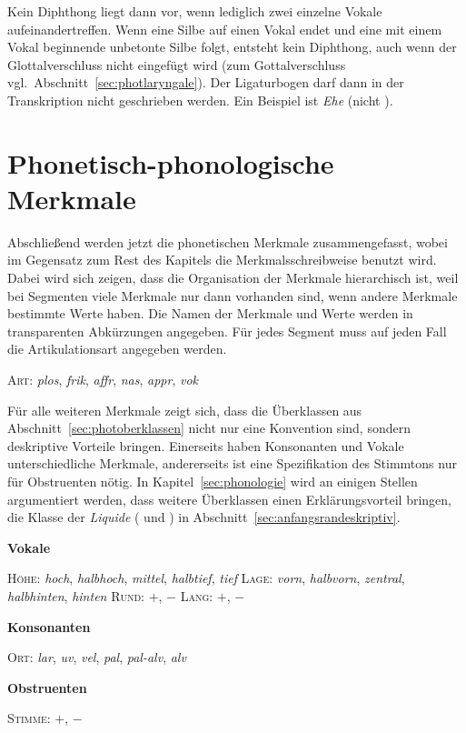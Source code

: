 Kein Diphthong liegt dann vor, wenn lediglich zwei einzelne Vokale aufeinandertreffen.
Wenn eine Silbe auf einen Vokal endet und eine mit einem Vokal beginnende unbetonte Silbe folgt, entsteht kein Diphthong, auch wenn der Glottalverschluss nicht eingefügt wird (zum Gottalverschluss vgl.\ Abschnitt~\ref{sec:photlaryngale}).
Der Ligaturbogen darf dann in der Transkription nicht geschrieben werden.
Ein Beispiel ist \textit{Ehe} \textipa{[Pe:@]} (nicht \Ast\textipa{[P\t{e@}]}).

\section{Phonetisch-phonologische Merkmale}

\label{sec:photpholmerkmale}

Abschließend werden jetzt die phonetischen Merkmale zusammengefasst, wobei im Gegensatz zum Rest des Kapitels die Merkmalsschreibweise benutzt wird.
Dabei wird sich zeigen, dass die Organisation der Merkmale hierarchisch ist, weil bei Segmenten viele Merkmale nur dann vorhanden sind, wenn andere Merkmale bestimmte Werte haben.
Die Namen der Merkmale und Werte werden in transparenten Abkürzungen angegeben.
Für jedes Segment muss auf jeden Fall die Artikulationsart angegeben werden.

\begin{exe}
	\ex \textsc{Art}: \textit{plos}, \textit{frik}, \textit{affr}, \textit{nas}, \textit{appr}, \textit{vok}
\end{exe}

Für alle weiteren Merkmale zeigt sich, dass die Überklassen aus Abschnitt~\ref{sec:photoberklassen} nicht nur eine Konvention sind, sondern deskriptive Vorteile bringen.
Einerseits haben Konsonanten und Vokale unterschiedliche Merkmale, andererseits ist eine Spezifikation des Stimmtons nur für Obstruenten nötig.
In Kapitel~\ref{sec:phonologie} wird an einigen Stellen argumentiert werden, dass weitere Überklassen einen Erklärungsvorteil bringen, \zB die Klasse der \textit{Liquide} (\textipa{[K]} und \textipa{[l]}) in Abschnitt~\ref{sec:anfangsrandeskriptiv}.

\begin{exe}
	\ex \textbf{Vokale}
		\begin{xlist}
			\ex \textsc{Höhe}: \textit{hoch}, \textit{halbhoch}, \textit{mittel}, \textit{halbtief}, \textit{tief}
			\ex \textsc{Lage}: \textit{vorn}, \textit{halbvorn}, \textit{zentral}, \textit{halbhinten}, \textit{hinten}
			\ex \textsc{Rund}: $+$, $-$
			\ex \textsc{Lang}: $+$, $-$
		\end{xlist}
	\ex \textbf{Konsonanten}
		\begin{xlist}
			\ex \textsc{Ort}: \textit{lar}, \textit{uv}, \textit{vel}, \textit{pal}, \textit{pal-alv}, \textit{alv}
		\end{xlist}
	\ex \textbf{Obstruenten}
		\begin{xlist}
			\ex \textsc{Stimme}: $+$, $-$
		\end{xlist}
\end{exe}


